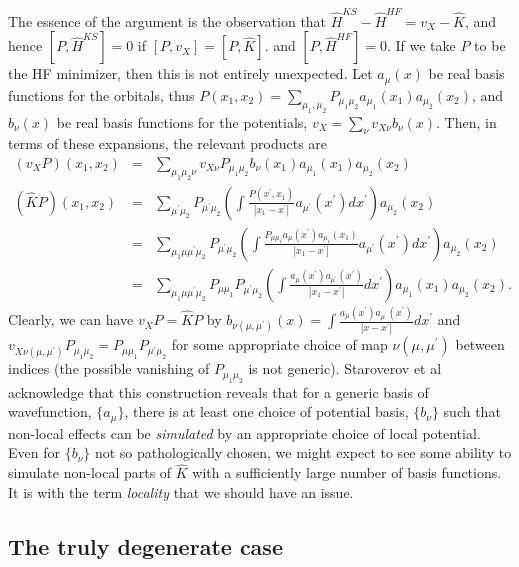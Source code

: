 \documentclass{article}
\newcommand{\beas}{\begin{eqnarray*}}
\newcommand{\enas}{\end{eqnarray*}}
\newcommand{\paren}[1]{\left({#1}\right)}
\newcommand{\brparen}[1]{\left[{#1}\right]}
\begin{document}
The essence of the argument is the observation that
$\hat{H}^{KS} -  \hat{H}^{HF} = v_X - \hat{K}$, and hence
$\brparen{P, \hat{H}^{KS}} = 0$ if 
$\brparen{ P, v_X } = \brparen{ P, \hat{K} }$.
and $\brparen{ P , \hat{H}^{HF} } = 0$.
If we take $P$ to be the HF minimizer, then
this is not entirely unexpected.
Let $a_\mu(x)$ be real basis functions for the orbitals, thus
$P(x_1,x_2) = \sum_{\mu_1,\mu_2} P_{\mu_1\mu_2} a_{\mu_1}(x_1) a_{\mu_2}(x_2)$,
and $b_{\nu}(x)$ be real basis functions for the potentials,
$v_X = \sum_{\nu} v_{X\nu} b_{\nu}(x)$.  Then, in terms of these
expansions, the relevant products are
\beas
  (v_X P)(x_1,x_2) &=& \sum_{\mu_1 \mu_2 \nu} v_{X\nu} P_{\mu_1\mu_2}
              b_{\nu}(x_1) a_{\mu_1}(x_1) a_{\mu_2}(x_2)\\
  (\hat{K} P)(x_1,x_2) &=&
      \sum_{\mu^\prime \mu_2} P_{\mu^\prime \mu_2}
     \paren{ \int \frac{P(x^\prime,x_1)}{|x_1-x^\prime|} a_{\mu^\prime}(x^\prime) dx^\prime }
     a_{\mu_2}(x_2)\\
 &=&
      \sum_{\mu_1 \mu \mu^\prime \mu_2} P_{\mu^\prime \mu_2}
     \paren{ \int \frac{ P_{\mu \mu_1} a_{\mu}(x^\prime) a_{\mu_1}(x_1) }{|x_1-x^\prime|} a_{\mu^\prime}(x^\prime) dx^\prime }
     a_{\mu_2}(x_2)\\
 &=&
      \sum_{\mu_1 \mu \mu^\prime \mu_2}  P_{\mu \mu_1} P_{\mu^\prime \mu_2}
     \paren{ \int \frac{ a_{\mu}(x^\prime)a_{\mu^\prime}(x^\prime) }{|x_1-x^\prime|} dx^\prime }
     a_{\mu_1}(x_1) a_{\mu_2}(x_2).
\enas
Clearly, we can have $v_X P = \hat{K} P$ by
$b_{\nu(\mu,\mu^\prime)}(x) 
= \int \frac{ a_{\mu}(x^\prime)a_{\mu^\prime}(x^\prime) }{|x-x^\prime|}
   dx^\prime$
and
$v_{X\nu(\mu,\mu^\prime)} P_{\mu_1 \mu_2} = P_{\mu \mu_1} P_{\mu^\prime \mu_2}$
for some appropriate choice of map $\nu(\mu,\mu^\prime)$ between indices
(the possible vanishing of $P_{\mu_1\mu_2}$ is not generic).
Staroverov et al acknowledge that this construction reveals that
for a generic basis of wavefunction, $\{a_\mu\}$, there is at least
one choice of potential basis, $\{ b_{\nu} \}$ such that non-local
effects can be {\em simulated} by an appropriate choice of local potential.
Even for $\{ b_{\nu} \}$ not so pathologically chosen, we might expect
to see some ability to simulate non-local parts of $\hat{K}$ with
a sufficiently large number of basis functions.
It is with the term {\em locality} that we should have an issue.

\subsection{The truly degenerate case}
\end{document}
